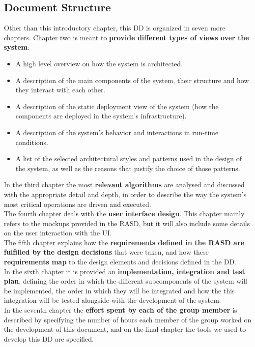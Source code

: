 \documentclass[12pt]{article}
\begin{document}
\subsection{Document Structure}
Other than this introductory chapter, this DD is organized in seven more chapters. Chapter two is meant to \textbf{provide different types of views over the system}:
\begin{itemize}
    \item A high level overview on how the system is architected.
    \item A description of the main components of the system, their structure and how they interact with each other.
    \item A description of the static deployment view of the system (how the components are deployed in the system's infrastructure). 
    \item A description of the system's behavior and interactions in run-time conditions.
    \item A list of the selected architectural styles and patterns used in the design of the system, as well as the reasons that justify the choice of those patterns.
\end{itemize}
In the third chapter the most \textbf{relevant algorithms} are analysed and discussed with the appropriate detail and depth, in order to describe the way the system's most critical operations are driven and executed.\\
The fourth chapter deals with the \textbf{user interface design}. This chapter mainly refers to the mockups provided in the RASD, but it will also include some details on the user interaction with the UI.\\
The fifth chapter explains how the \textbf{requirements defined in the RASD are fulfilled by the design decisions} that were taken, and how these \textbf{requirements map} to the design elements and decisions defined in the DD.\\
In the sixth chapter it is provided an \textbf{implementation, integration and test plan}, defining the order in which the different subcomponents of the system will be implemented, the order in which they will be integrated and how the this integration will be tested alongside with the development of the system.\\
In the seventh chapter the \textbf{effort spent by each of the group member} is described by specifying the number of hours each member of the group worked on the development of this document, and on the final chapter the tools we used to develop this DD are specified.
\end{document}
